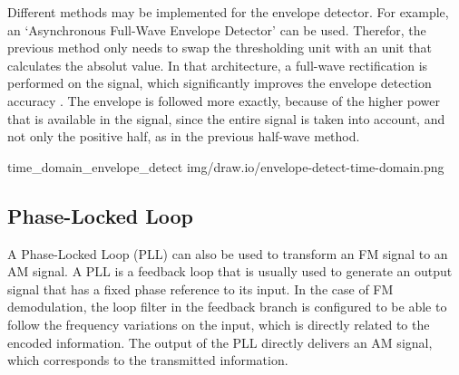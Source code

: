 Different methods may be implemented for the envelope detector.
For example, an `Asynchronous Full-Wave Envelope Detector' can be used.
Therefor, the previous method only needs to swap the thresholding unit with an unit that calculates the absolut value.
In that architecture, a full-wave rectification is performed on the signal, which significantly improves the envelope detection accuracy \cite{DSPRelatedEnvelopeDetection}.
The envelope is followed more exactly, because of the higher power that is available in the signal, since the entire signal is taken into account, and not only the positive half, as in the previous half-wave method.

 {time_domain_envelope_detect} {img/draw.io/envelope-detect-time-domain.png}

\subsection{Phase-Locked Loop}

A Phase-Locked Loop (PLL) can also be used to transform an FM signal to an AM signal.
A PLL is a feedback loop that is usually used to generate an output signal that has a fixed phase reference to its input.
In the case of FM demodulation, the loop filter in the feedback branch is configured to be able to follow the frequency variations on the input, which is directly related to the encoded information.
The output of the PLL directly delivers an AM signal, which corresponds to the transmitted information. \cite{SchnyderHaller2002}\\

